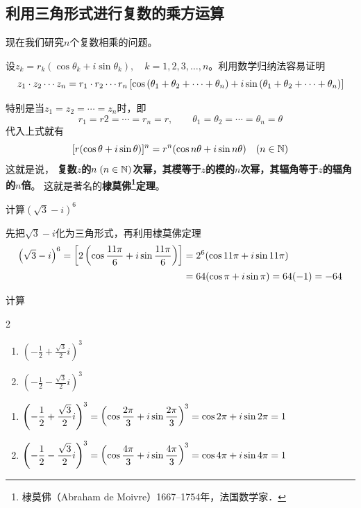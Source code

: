 \subsection{利用三角形式进行复数的乘方运算}

现在我们研究$n$个复数相乘的问题。

设$z_k=r_k(\cos\theta_k+i\sin\theta_k),\quad k=1,2,3,\ldots,n$。利用数学归纳法容易证明
\[z_1\cdot z_2\cdots z_n=r_1\cdot r_2\cdots r_n\left[\cos\left(\theta_1+\theta_2+\cdots+\theta_n\right)+i\sin\left(\theta_1+\theta_2+\cdots+\theta_n\right)\right]\]

特别是当$z_1= z_2=\cdots= z_n$时，即
\[r_1=r2=\cdots=r_n=r,\qquad \theta_1=\theta_2=\cdots=\theta_n=\theta\]
代入上式就有
\[[r(\cos\theta+i\sin\theta)]^n=r^n(\cos n\theta+i\sin n\theta)\quad (n\in\mathbb{N})\]
这就是说，
\textbf{复数$z$的$n\; (n\in\mathbb{N})$次幂，其模等于$z$的模的$n$次幂，其辐角等于$z$的辐角的$n$倍}。
这就是著名的\textbf{棣莫佛\footnote{棣莫佛（Abraham de Moivre）1667--1754年，法国数学家．}定理}。

\begin{example}
计算$\left(\sqrt{3}-i\right)^6$
\end{example}

\begin{solution}
先把$\sqrt{3}-i$化为三角形式，再利用棣莫佛定理
\[\begin{split}
\left(\sqrt{3}-i\right)^6=\left[2\left(\cos\dfrac{11\pi}{6}+i\sin\dfrac{11\pi}{6}\right)\right]&=2^6(\cos11\pi+i\sin11\pi)\\
&=64(\cos\pi+i\sin\pi)=64(-1)=-64
\end{split}\]
\end{solution}


\begin{example}
    计算
\begin{multicols}{2}
\begin{enumerate}[(1)]
    \item $\left(-\frac{1}{2}+\frac{\sqrt{3}}{2}i\right)^3$
    \item $\left(-\frac{1}{2}-\frac{\sqrt{3}}{2}i\right)^3$
\end{enumerate}
\end{multicols}
\end{example}

\begin{solution}
\begin{enumerate}[(1)]
    \item $\left(-\dfrac{1}{2}+\dfrac{\sqrt{3}}{2}i\right)^3=\left(\cos\dfrac{2\pi}{3}+i\sin\dfrac{2\pi}{3}\right)^3=\cos2\pi+i\sin2\pi=1$
    \item $\left(-\dfrac{1}{2}-\dfrac{\sqrt{3}}{2}i\right)^3=\left(\cos\dfrac{4\pi}{3}+i\sin\dfrac{4\pi}{3}\right)^3=\cos4\pi+i\sin4\pi=1$
\end{enumerate}
\end{solution}

